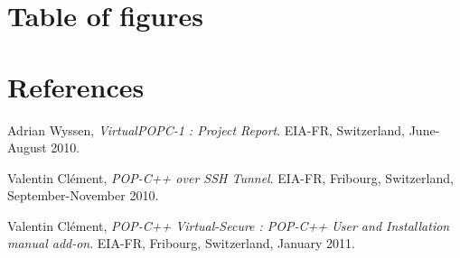 \documentclass[a4paper, 11pt]{article}
\begin{document}
\pagebreak


\pagebreak


\pagebreak


\pagebreak


\pagebreak


\pagebreak



\pagebreak
\section{Table of figures}
\listoffigures{}





%
%

\section{References}
\begin{thebibliography}{9}
	Adrian Wyssen,
  	\emph{VirtualPOPC-1 : Project Report}.
	EIA-FR, Switzerland, 
	June-August 2010.
	
	Valentin Clément,
	\emph{POP-C++ over SSH Tunnel}.
	EIA-FR, Fribourg, Switzerland,
	September-November 2010.
	
	Valentin Clément,
	\emph{POP-C++ Virtual-Secure : POP-C++ User and Installation manual add-on}.
	EIA-FR, Fribourg, Switzerland, 
	January 2011.

\end{thebibliography}
\end{document}
